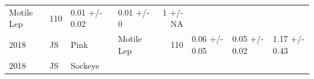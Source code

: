 \documentclass[fleqn,10pt]{wlpeerj} %
\begin{document}
\begin{longtable}[]{@{}llllrlll@{}}
\begin{minipage}[t]{0.11\columnwidth}
Motile Lep\strut
\end{minipage} & \begin{minipage}[t]{0.04\columnwidth}\raggedleft\strut
110\strut
\end{minipage} & \begin{minipage}[t]{0.14\columnwidth}\raggedright\strut
0.01 +/- 0.02\strut
\end{minipage} & \begin{minipage}[t]{0.14\columnwidth}\raggedright\strut
0.01 +/- 0\strut
\end{minipage} & \begin{minipage}[t]{0.14\columnwidth}\raggedright\strut
1 +/- NA\strut
\end{minipage}\tabularnewline
\begin{minipage}[t]{0.09\columnwidth}\raggedright\strut
2018\strut
\end{minipage} & \begin{minipage}[t]{0.06\columnwidth}\raggedright\strut
JS\strut
\end{minipage} & \begin{minipage}[t]{0.06\columnwidth}\raggedright\strut
Pink\strut
\end{minipage} & \begin{minipage}[t]{0.11\columnwidth}\raggedright\strut
Motile Lep\strut
\end{minipage} & \begin{minipage}[t]{0.04\columnwidth}\raggedleft\strut
110\strut
\end{minipage} & \begin{minipage}[t]{0.14\columnwidth}\raggedright\strut
0.06 +/- 0.05\strut
\end{minipage} & \begin{minipage}[t]{0.14\columnwidth}\raggedright\strut
0.05 +/- 0.02\strut
\end{minipage} & \begin{minipage}[t]{0.14\columnwidth}\raggedright\strut
1.17 +/- 0.43\strut
\end{minipage}\tabularnewline
\begin{minipage}[t]{0.09\columnwidth}\raggedright\strut
2018\strut
\end{minipage} & \begin{minipage}[t]{0.06\columnwidth}\raggedright\strut
JS\strut
\end{minipage} & \begin{minipage}[t]{0.06\columnwidth}\raggedright\strut
Sockeye\strut
\end{minipage} & \begin{minipage}[t]{0.11\columnwidth}\raggedright\strut

\end{minipage}
\end{longtable}
\end{document}
